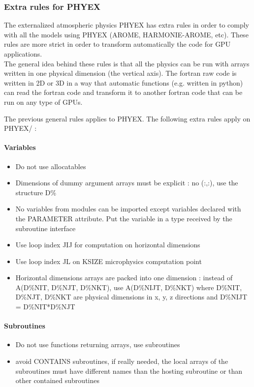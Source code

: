 \subsubsection{Extra rules for PHYEX}
The externalized atmospheric physics PHYEX has extra rules in order to comply with all the models using PHYEX (AROME, HARMONIE-AROME, etc). These rules are more strict in order to transform automatically the code for GPU applications. \\
The general idea behind these rules is that all the physics can be run with arrays written in one physical dimension (the vertical axis). The fortran raw code is written in 2D or 3D in a way that automatic functions (e.g. written in python) can read the fortran code and transform it to another fortran code that can be run on any type of GPUs.

The previous general rules applies to PHYEX. The following extra rules apply on PHYEX/ :

\paragraph{Variables}
\begin{itemize}
    \item Do not use allocatables
    \item Dimensions of dummy argument arrays must be explicit : no (:,:), use the structure D\%
    \item No variables from modules can be imported except variables declared with the PARAMETER attribute. Put the variable in a type received by the subroutine interface
    \item Use loop index JIJ for computation on horizontal dimensions
    \item Use loop index JL on KSIZE microphysics computation point
    \item Horizontal dimensions arrays are packed into one dimension : instead of A(D\%NIT, D\%NJT, D\%NKT), use A(D\%NIJT, D\%NKT) where D\%NIT, D\%NJT, D\%NKT are physical dimensions in x, y, z directions and D\%NIJT = D\%NIT*D\%NJT
\end{itemize}

\paragraph{Subroutines}
\begin{itemize}
    \item Do not use functions returning arrays, use subroutines
    \item avoid CONTAINS subroutines, if really needed, the local arrays of the subroutines must have different names than the hosting subroutine or than other contained subroutines
\end{itemize}

